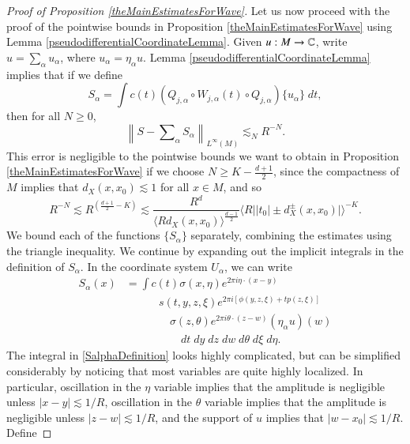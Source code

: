 \begin{proof}[Proof of Proposition \ref{theMainEstimatesForWave}]
Let us now proceed with the proof of the pointwise bounds in Proposition \ref{theMainEstimatesForWave} using Lemma \ref{pseudodifferentialCoordinateLemma}. Given $u: M \to \operatorname{\mathbb{C}}$, write $u = \sum_\alpha u_\alpha$, where $u_\alpha = \eta_\alpha u$. Lemma \ref{pseudodifferentialCoordinateLemma} implies that if we define
%
\begin{equation}
    S_\alpha = \int c(t) (Q_{j,\alpha} \circ W_{j,\alpha}(t) \circ Q_{j,\alpha}) \{ u_\alpha \}\; dt,
\end{equation}
%
then for all $N \geq 0$,
%
\begin{equation} \label{parametrixerrroestimate}
    \left\| S - \textstyle\sum\nolimits_\alpha S_\alpha \right\|_{L^\infty(M)} \lesssim_N R^{-N}.
\end{equation}
%
This error is negligible to the pointwise bounds we want to obtain in Proposition \ref{theMainEstimatesForWave} if we choose $N \geq K - \frac{d+1}{2}$, since the compactness of $M$ implies that $d_X(x,x_0) \lesssim 1$ for all $x \in M$, and so
%
\begin{equation}
    R^{-N} \lesssim R^{\left( \frac{d+1}{2} - K \right)} \lesssim \frac{R^{d}}{\langle R d_X(x,x_0) \rangle^{\frac{d-1}{2}}} \big\langle R \big| |t_0| \pm d_X^\pm(x,x_0) \big| \big\rangle^{-K}.
\end{equation}
%
We bound each of the functions $\{ S_\alpha \}$ separately, combining the estimates using the triangle inequality. We continue by expanding out the implicit integrals in the definition of $S_\alpha$. In the coordinate system $U_\alpha$, we can write
%
\begin{equation} \label{SalphaDefinition}
\begin{split}
    S_\alpha(x) &= \int c(t) \sigma(x,\eta) e^{2 \pi i \eta \cdot (x - y)}\\[-6 pt]
    &\quad\quad\quad s(t,y,z,\xi) e^{2 \pi i [ \phi(y,z,\xi) + t p(z,\xi) ]}\\
    &\quad\quad\quad\quad \sigma(z,\theta) e^{2 \pi i \theta \cdot (z - w)} (\eta_\alpha u)(w)\\
    &\quad\quad\quad\quad\quad dt\; dy\; dz\; dw\; d\theta\; d\xi\; d\eta.
\end{split}
\end{equation}
%
The integral in \eqref{SalphaDefinition} looks highly complicated, but can be simplified considerably by noticing that most variables are quite highly localized. In particular, oscillation in the $\eta$ variable implies that the amplitude is negligible unless $|x - y| \lesssim 1/R$, oscillation in the $\theta$ variable implies that the amplitude is negligible unless $|z - w| \lesssim 1/R$, and the support of $u$ implies that $|w - x_0| \lesssim 1/R$. Define

\end{proof}
